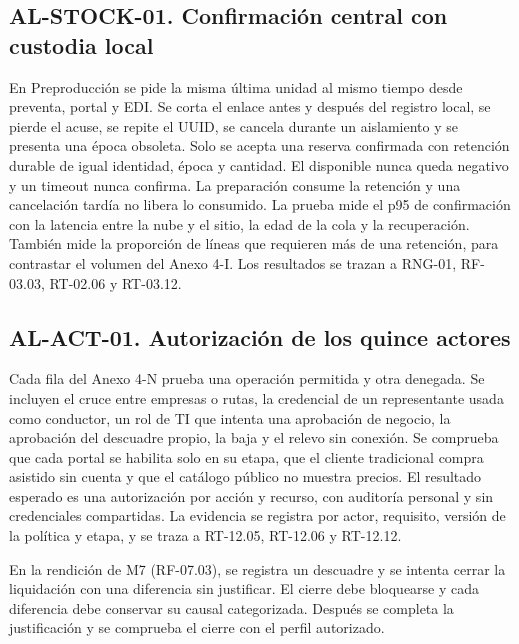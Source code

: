 \subsection*{AL-STOCK-01. Confirmación central con custodia local}
En Preproducción se pide la misma última unidad al mismo tiempo desde preventa, portal y EDI. Se corta el enlace antes y después del registro local, se pierde el acuse, se repite el UUID, se cancela durante un aislamiento y se presenta una época obsoleta. Solo se acepta una reserva confirmada con retención durable de igual identidad, época y cantidad. El disponible nunca queda negativo y un timeout nunca confirma. La preparación consume la retención y una cancelación tardía no libera lo consumido. La prueba mide el p95 de confirmación con la latencia entre la nube y el sitio, la edad de la cola y la recuperación. También mide la proporción de líneas que requieren más de una retención, para contrastar el volumen del Anexo 4-I. Los resultados se trazan a RNG-01, RF-03.03, RT-02.06 y RT-03.12.

\subsection*{AL-ACT-01. Autorización de los quince actores}
\enlargethispage{2\baselineskip}
Cada fila del Anexo 4-N prueba una operación permitida y otra denegada. Se incluyen el cruce entre empresas o rutas, la credencial de un representante usada como conductor, un rol de TI que intenta una aprobación de negocio, la aprobación del descuadre propio, la baja y el relevo sin conexión. Se comprueba que cada portal se habilita solo en su etapa, que el cliente tradicional compra asistido sin cuenta y que el catálogo público no muestra precios. El resultado esperado es una autorización por acción y recurso, con auditoría personal y sin credenciales compartidas. La evidencia se registra por actor, requisito, versión de la política y etapa, y se traza a RT-12.05, RT-12.06 y RT-12.12.


En la rendición de M7 (RF-07.03), se registra un descuadre y se intenta cerrar la liquidación con una diferencia sin justificar. El cierre debe bloquearse y cada diferencia debe conservar su causal categorizada. Después se completa la justificación y se comprueba el cierre con el perfil autorizado.

